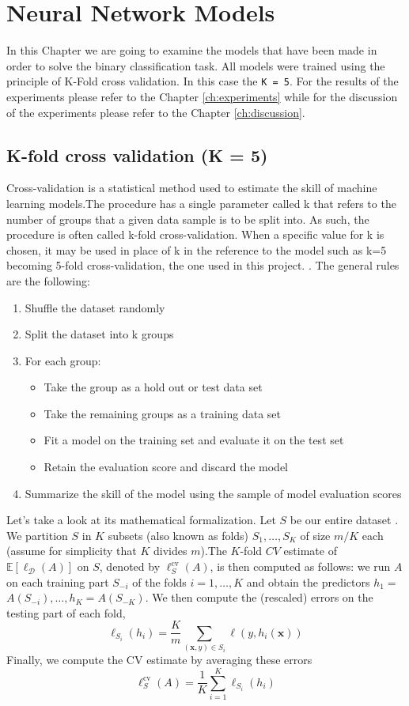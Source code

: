 \chapter{Neural Network Models} \label{ch:nnm}
In this Chapter we are going to examine the models that have been made in order to solve the binary classification task.
All models were trained using the principle of K-Fold cross validation. In this case the \texttt{K = 5}. For the results of the experiments please refer to the Chapter \ref{ch:experiments} while for the discussion of the experiments please refer to the Chapter \ref{ch:discussion}.

\section{K-fold cross validation (K = 5)}
Cross-validation is a statistical method used to estimate the skill of machine learning models.The procedure has a single parameter called k that refers to the number of groups that a given data sample is to be split into. As such, the procedure is often called k-fold cross-validation. When a specific value for k is chosen, it may be used in place of k in the reference to the model such as k=5 becoming 5-fold cross-validation, the one used in this project. \cite{kfold}.
The general rules are the following:
\begin{enumerate}
\item Shuffle the dataset randomly
\item Split the dataset into k groups
\item For each group:
\begin{itemize}
\item Take the group as a hold out or test data set
\item Take the remaining groups as a training data set
\item Fit a model on the training set and evaluate it on the test set
\item Retain the evaluation score and discard the model
\end{itemize}
\item Summarize the skill of the model using the sample of model evaluation scores
\end{enumerate}
Let's take a look at its mathematical formalization.
Let $S$ be our entire dataset \cite{kfoldmath}. We partition $S$ in $K$ subsets (also known as folds) $S_1, \ldots, S_K$ of size $m / K$ each (assume for simplicity that $K$ divides $m$).The $K$-fold $C V$ estimate of $\mathbb{E}\left[\ell_{\mathcal{D}}(A)\right]$ on $S$, denoted by $\ell_S^{\mathrm{cv}}(A)$, is then computed as follows: we run $A$ on each training part $S_{-i}$ of the folds $i=1, \ldots, K$ and obtain the predictors $h_1=$ $A\left(S_{-i}\right), \ldots, h_K=A\left(S_{-K}\right)$. We then compute the (rescaled) errors on the testing part of each fold,
$$
\ell_{S_i}\left(h_i\right)=\frac{K}{m} \sum_{(\boldsymbol{x}, y) \in S_i} \ell\left(y, h_i(\boldsymbol{x})\right)
$$
Finally, we compute the CV estimate by averaging these errors
$$
\ell_S^{\mathrm{cv}}(A)=\frac{1}{K} \sum_{i=1}^K \ell_{S_i}\left(h_i\right)
$$
